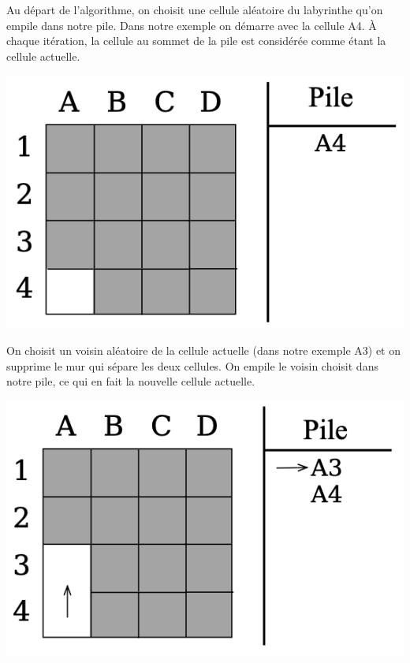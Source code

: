 \begin{minipage}{0.6\textwidth}
Au départ de l'algorithme, on choisit une cellule aléatoire du labyrinthe qu'on empile dans notre pile. Dans notre exemple on démarre avec la cellule A4. À chaque itération, la cellule au sommet de la pile est considérée comme étant la cellule actuelle.
\end{minipage}
\begin{minipage}{0.4\textwidth}
\includegraphics[width=\linewidth]{report/pics/backtracking1.png}
\end{minipage}

\begin{minipage}{0.6\textwidth}
On choisit un voisin aléatoire de la cellule actuelle (dans notre exemple A3) et on supprime le mur qui sépare les deux cellules. On empile le voisin choisit dans notre pile, ce qui en fait la nouvelle cellule actuelle.
\end{minipage}
\begin{minipage}{0.4\textwidth}
\includegraphics[width=\linewidth]{report/pics/backtracking2.png}
\end{minipage}

